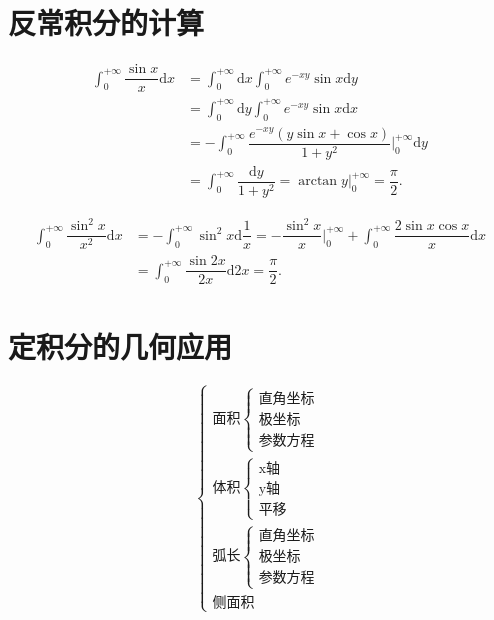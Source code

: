 \section{反常积分的计算}


\begin{equation*}
    \begin{aligned}
        \int_0^{+\infty}\dfrac{\sin x}{x}\mathrm{d}x &= 
        \int_0^{+\infty}\mathrm{d}x\int_0^{+\infty}e^{-xy}\sin x \mathrm{d}y \\ 
        &= \int_0^{+\infty}\mathrm{d}y\int_0^{+\infty}e^{-xy}\sin x \mathrm{d}x \\ 
        &= -\int_0^{+\infty}\dfrac{e^{-xy}(y\sin x +\cos x)}{1+y^2}\Big|_0^{+\infty}
        \mathrm{d}y\\ &= \int_0^{+\infty}\dfrac{\mathrm{d}y}{1+y^2} = \arctan y\Big|_0^{+\infty}
        = \dfrac{\pi}{2}.
    \end{aligned}
\end{equation*}

\begin{equation*}
    \begin{aligned}
        \int_0^{+\infty}\dfrac{\sin^2 x}{x^2}\mathrm{d}x &= 
        -\int_0^{+\infty}\sin^2 x\mathrm{d}\dfrac{1}{x} =
        -\dfrac{\sin^2 x}{x}\Big|_0^{+\infty} + \int_0^{+\infty}
        \dfrac{2\sin x\cos x}{x}\mathrm{d}x
        \\&= \int_0^{+\infty}\dfrac{\sin 2x}{2x}\mathrm{d}2x
        = \dfrac{\pi}{2}.
    \end{aligned}
\end{equation*}

\section{定积分的几何应用}

$$ \begin{cases}
    \textrm{面积}\begin{cases}
        \textrm{直角坐标}\\\textrm{极坐标}\\\textrm{参数方程}
    \end{cases}\\
    \textrm{体积}\begin{cases}
        \textrm{x轴}\\\textrm{y轴}\\\textrm{平移}
    \end{cases}\\
    \textrm{弧长}\begin{cases}
        \textrm{直角坐标}\\\textrm{极坐标}\\\textrm{参数方程}
    \end{cases}\\
    \textrm{侧面积}
\end{cases} $$ 

